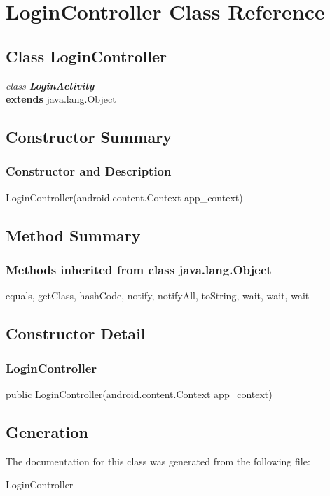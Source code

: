 \hypertarget{class_LoginController.Android}{\section{LoginController Class Reference}
\label{class_LoginController.Android}
}

\subsection*{Class LoginController}

\textit{class \textbf{LoginActivity}}\\
\tab \textbf{extends} java.lang.Object\\





\subsection{Constructor Summary}

\subsubsection{Constructor and Description}

LoginController(android.content.Context app\_context)\\



\subsection{Method Summary}

\subsubsection{Methods inherited from class java.lang.Object}

equals, getClass, hashCode, notify, notifyAll, toString, wait, wait, wait


\subsection{Constructor Detail}

\subsubsection{LoginController}

public LoginController(android.content.Context app\_context)\\


\subsection{Generation}
The documentation for this class was generated from the following file\-:
\begin{DoxyCompactItemize}
\item LoginController
\end{DoxyCompactItemize} 









